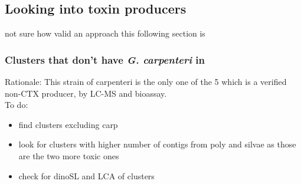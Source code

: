 \documentclass[12pt]{article}
\begin{document}

\subsection*{Looking into toxin producers}
not sure how valid an approach this following section is
\subsubsection*{Clusters that don't have \textit{G. carpenteri} in}
Rationale: This strain of carpenteri is the only one of the 5 which is a verified non-CTX producer, by LC-MS and bioassay.\\
To do:
\begin{itemize}
\item find clusters excluding carp
\item look for clusters with higher number of contigs from poly and silvae as those are the two more toxic ones
\item check for dinoSL and LCA of clusters
\end{itemize}
\end{document}
